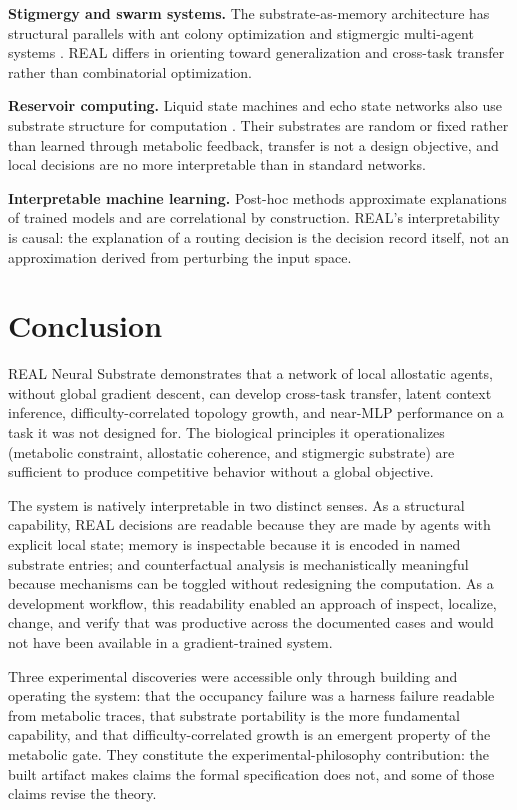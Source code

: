 \documentclass[letterpaper]{article}
\begin{document}
\textbf{Stigmergy and swarm systems.} The substrate-as-memory architecture has
structural parallels with ant colony optimization \citep{dorigo1996antsystem} and
stigmergic multi-agent systems \citep{theraulaz1999stigmergy}. REAL differs in
orienting toward generalization and cross-task transfer rather than combinatorial
optimization.

\textbf{Reservoir computing.} Liquid state machines and echo state networks also
use substrate structure for computation \citep{maass2002realtime,jaeger2001echo}.
Their substrates are random or fixed rather than learned through metabolic
feedback, transfer is not a design objective, and local decisions are no more
interpretable than in standard networks.

\textbf{Interpretable machine learning.} Post-hoc methods
\citep{lundberg2017shap,ribeiro2016lime,sundararajan2017integrated} approximate
explanations of trained models and are correlational by construction. REAL's
interpretability is causal: the explanation of a routing decision is the decision
record itself, not an approximation derived from perturbing the input space.

\section{Conclusion}

REAL Neural Substrate demonstrates that a network of local allostatic agents,
without global gradient descent, can develop cross-task transfer, latent context
inference, difficulty-correlated topology growth, and near-MLP performance on a
task it was not designed for. The biological principles it operationalizes
(metabolic constraint, allostatic coherence, and stigmergic substrate) are
sufficient to produce competitive behavior without a global objective.

The system is natively interpretable in two distinct senses. As a structural
capability, REAL decisions are readable because they are made by agents with
explicit local state; memory is inspectable because it is encoded in named
substrate entries; and counterfactual analysis is mechanistically meaningful
because mechanisms can be toggled without redesigning the computation. As a
development workflow, this readability enabled an approach of inspect, localize,
change, and verify that was productive across the documented cases and would not
have been available in a gradient-trained system.

Three experimental discoveries were accessible only through building and operating
the system: that the occupancy failure was a harness failure readable from
metabolic traces, that substrate portability is the more fundamental capability,
and that difficulty-correlated growth is an emergent property of the metabolic
gate. They constitute the experimental-philosophy contribution: the built artifact
makes claims the formal specification does not, and some of those claims revise the
theory.
\end{document}
